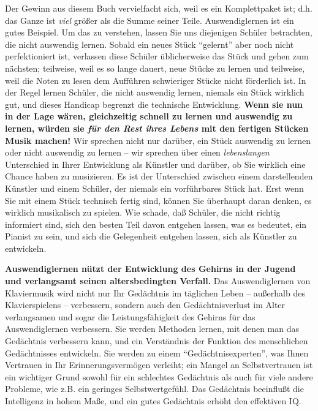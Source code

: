 Der Gewinn aus diesem Buch vervielfacht sich, weil es ein Komplettpaket ist; d.h. das Ganze ist \textit{viel} größer als die Summe seiner Teile.
Auswendiglernen ist ein gutes Beispiel.
Um das zu verstehen, lassen Sie uns diejenigen Schüler betrachten, die nicht auswendig lernen.
Sobald ein neues Stück \enquote{gelernt} aber noch nicht perfektioniert ist, verlassen diese Schüler üblicherweise das Stück und gehen zum nächsten; teilweise, weil es so lange dauert, neue Stücke zu lernen und teilweise, weil die Noten zu lesen dem Aufführen schwieriger Stücke nicht förderlich ist.
In der Regel lernen Schüler, die nicht auswendig lernen, niemals ein Stück wirklich gut, und dieses Handicap begrenzt die technische Entwicklung.
\textbf{Wenn sie nun in der Lage wären, gleichzeitig schnell zu lernen und auswendig zu lernen, würden sie \textit{für den Rest ihres Lebens} mit den fertigen Stücken Musik machen!}
Wir sprechen nicht nur darüber, ein Stück auswendig zu lernen oder nicht auswendig zu lernen -- wir sprechen über einen \textit{lebenslangen} Unterschied in Ihrer Entwicklung als Künstler und darüber, ob Sie wirklich eine Chance haben zu musizieren.
Es ist der Unterschied zwischen einem darstellenden Künstler und einem Schüler, der niemals ein vorführbares Stück hat.
Erst wenn Sie mit einem Stück technisch fertig sind, können Sie überhaupt daran denken, es wirklich musikalisch zu spielen.
Wie schade, daß Schüler, die nicht richtig informiert sind, sich den besten Teil davon entgehen lassen, was es bedeutet, ein Pianist zu sein, und sich die Gelegenheit entgehen lassen, sich als Künstler zu entwickeln.

\textbf{Auswendiglernen nützt der Entwicklung des Gehirns in der Jugend und verlangsamt seinen altersbedingten Verfall.} Das Auswendiglernen von Klaviermusik wird nicht nur Ihr Gedächtnis im täglichen Leben -- außerhalb des Klavierspielens -- verbessern, sondern auch den Gedächtnisverlust im Alter verlangsamen und sogar die Leistungsfähigkeit des Gehirns für das Auswendiglernen verbessern.
Sie werden Methoden lernen, mit denen man das Gedächtnis verbessern kann, und ein Verständnis der Funktion des menschlichen Gedächtnisses entwickeln.
Sie werden zu einem \enquote{Gedächtnisexperten}, was Ihnen Vertrauen in Ihr Erinnerungsvermögen verleiht; ein Mangel an Selbstvertrauen ist ein wichtiger Grund sowohl für ein schlechtes Gedächtnis als auch für viele andere Probleme, wie z.B. ein geringes Selbstwertgefühl.
Das Gedächtnis beeinflußt die Intelligenz in hohem Maße, und ein gutes Gedächtnis erhöht den effektiven IQ.

